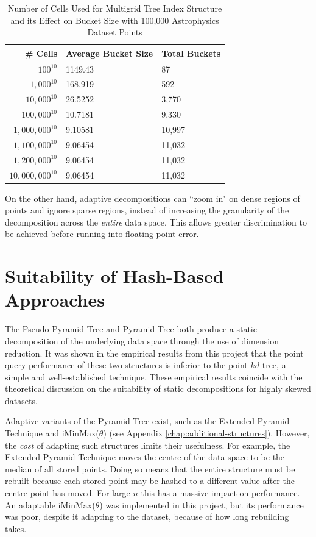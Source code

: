 \begin{table}
	\centering
	\begin{tabular}{|r|l|l|}
	\hline
	\textbf{\# Cells} & \textbf{Average Bucket Size} & \textbf{Total Buckets} \\
	\hline
	$100^{10}$ & 1149.43 & 87 \\
	$1,000^{10}$ & 168.919 & 592 \\
	$10,000^{10}$ & 26.5252 & 3,770 \\
	$100,000^{10}$ & 10.7181 & 9,330 \\
	$1,000,000^{10}$ & 9.10581 & 10,997 \\
	$1,100,000^{10}$ & 9.06454 & 11,032 \\
	$1,200,000^{10}$ & 9.06454 & 11,032 \\
	$10,000,000^{10}$ & 9.06454 & 11,032 \\
	\hline
	\end{tabular}
	\caption{Number of Cells Used for Multigrid Tree Index Structure and its Effect on Bucket Size with 100,000 Astrophysics Dataset Points}
	\label{tab:cell-size-effect}
\end{table}

On the other hand, adaptive decompositions can ``zoom in" on dense regions of points and ignore sparse regions, instead of increasing the granularity of the decomposition across the \textit{entire} data space. This allows greater discrimination to be achieved before running into floating point error.

\section{Suitability of Hash-Based Approaches}
	
The Pseudo-Pyramid Tree and Pyramid Tree both produce a static decomposition of the underlying data space through the use of dimension reduction. It was shown in the empirical results from this project that the point query performance of these two structures is inferior to the point $kd$-tree, a simple and well-established technique. These empirical results coincide with the theoretical discussion on the suitability of static decompositions for highly skewed datasets.

Adaptive variants of the Pyramid Tree exist, such as the Extended Pyramid-Technique \cite{pyramid-tree} and iMinMax($\theta$) (see Appendix \ref{chap:additional-structures}). However, the \textit{cost} of adapting such structures limits their usefulness. For example, the Extended Pyramid-Technique moves the centre of the data space to be the median of all stored points. Doing so means that the entire structure must be rebuilt because each stored point may be hashed to a different value after the centre point has moved. For large $n$ this has a massive impact on performance. An adaptable iMinMax($\theta$) was implemented in this project, but its performance was poor, despite it adapting to the dataset, because of how long rebuilding takes.

